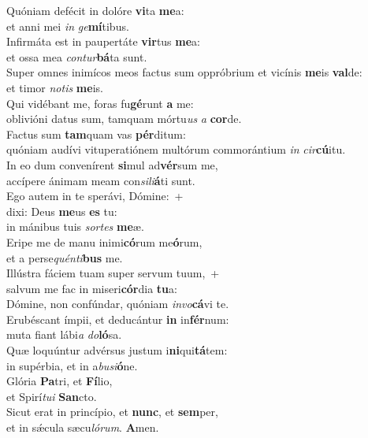 \evenverse Quóniam defécit in dolóre \textbf{vi}ta \textbf{me}a:~\*\\
\evenverse et anni mei \textit{in} \textit{ge}\textbf{mí}tibus.\\
\oddverse Infirmáta est in paupertáte \textbf{vir}tus \textbf{me}a:~\*\\
\oddverse et ossa mea \textit{con}\textit{tur}\textbf{bá}ta sunt.\\
\evenverse Super omnes inimícos meos factus sum oppróbrium et vicínis \textbf{me}is \textbf{val}de:~\*\\
\evenverse et timor \textit{no}\textit{tis} \textbf{me}is.\\
\oddverse Qui vidébant me, foras fu\textbf{gé}runt \textbf{a} me:~\*\\
\oddverse oblivióni datus sum, tamquam mórtu\textit{us} \textit{a} \textbf{cor}de.\\
\evenverse Factus sum \textbf{tam}quam vas \textbf{pér}ditum:~\*\\
\evenverse quóniam audívi vituperatiónem multórum commorántium \textit{in} \textit{cir}\textbf{cú}itu.\\
\oddverse In eo dum convenírent \textbf{si}mul ad\textbf{vér}sum me,~\*\\
\oddverse accípere ánimam meam con\textit{si}\textit{li}\textbf{á}ti sunt.\\
\evenverse Ego autem in te sperávi, Dómine:~+\\
\evenverse  dixi: Deus \textbf{me}us \textbf{es} tu:~\*\\
\evenverse in mánibus tuis \textit{sor}\textit{tes} \textbf{me}æ.\\
\oddverse Eripe me de manu inimi\textbf{có}rum me\textbf{ó}rum,~\*\\
\oddverse et a perse\textit{quén}\textit{ti}\textbf{bus} me.\\
\evenverse Illústra fáciem tuam super servum tuum,~+\\
\evenverse  salvum me fac in miseri\textbf{cór}dia \textbf{tu}a:~\*\\
\evenverse Dómine, non confúndar, quóniam \textit{in}\textit{vo}\textbf{cá}vi te.\\
\oddverse Erubéscant ímpii, et deducántur \textbf{in} in\textbf{fér}num:~\*\\
\oddverse muta fiant lábi\textit{a} \textit{do}\textbf{ló}sa.\\
\evenverse Quæ loquúntur advérsus justum i\textbf{ni}qui\textbf{tá}tem:~\*\\
\evenverse in supérbia, et in a\textit{bu}\textit{si}\textbf{ó}ne.\\
\oddverse Glória \textbf{Pa}tri, et \textbf{Fí}lio,~\*\\
\oddverse et Spirí\textit{tu}\textit{i} \textbf{San}cto.\\
\evenverse Sicut erat in princípio, et \textbf{nunc}, et \textbf{sem}per,~\*\\
\evenverse et in sǽcula sæcu\textit{ló}\textit{rum}. \textbf{A}men.\\
